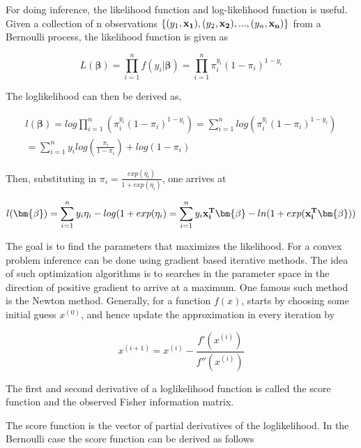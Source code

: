 For doing inference, the likelihood function and log-likelihood function is useful. Given a collection of n observations $\{(y_1, {\bf x_1}), (y_2, {\bf x_2}),...,(y_n, {\bf x_n})\}$ from a Bernoulli process, the likelihood function is given as

\begin{equation}
    L(\bm{\beta}) = \prod_{i=1}^{n} f(y_i |\bm{ \beta}) = \prod_{i=1}^{n} \pi_i^{y_i}(1-\pi_i)^{1-y_i}
\end{equation}

The loglikelihood can then be derived as,

\begin{equation}
\begin{split}
    l(\bm{\beta}) = log \prod_{i=1}^{n} (\pi_i^{y_i}(1-\pi_i)^{1-y_i})  =
    \sum_{i=1}^n log (\pi_i^{y_i}(1-\pi_i)^{1-y_i})\\ =  \sum_{i=1}^{n} y_i log(\frac{\pi_i}{1-\pi_i}) + log(1-\pi_i)
\end{split}
\end{equation}

Then, substituting in $\pi_i = \frac{exp(\eta_i)}{1+exp(\eta_i)}$, one arrives at

\begin{equation}
    l(\bm{\beta}) = \sum_{i=1}^{n} y_i \eta_i - log(1 + exp(\eta_i) = \sum_{i=1}^n y_i{\bf x_i^T} \bm{ \beta} - ln(1 + exp(\bf x_i^T \bm{ \beta}))
\end{equation}

The goal is to find the parameters that maximizes the likelihood. For a convex problem inference can be done using gradient based iterative methods. The idea of such optimization algorithms is to searches in the parameter space in the direction of positive gradient to arrive at a maximum. One famous such method is the Newton method. Generally, for a function $f(x)$, starts by choosing some initial guess $x^{(0)}$, and hence update the approximation in every iteration by

\begin{equation}
    x^{(i+1)} = x^{(i)} - \frac{f'(x^{(i)})}{f''(x^{(i)})}
\end{equation}

The first and second derivative of a loglikelihood function is called the score function and the observed Fisher information matrix.

The score function is the vector of partial derivatives of the loglikelihood. In the Bernoulli case the score function can be derived as follows


